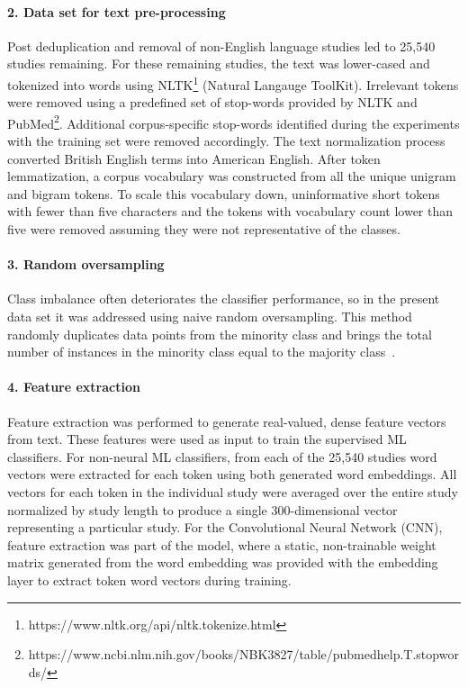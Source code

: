 \documentclass{IOS-Book-Article}
\begin{document}
\paragraph{2. Data set for text pre-processing}
\label{method:preprocessing}
%
Post deduplication and removal of non-English language studies led to 25,540 studies remaining.
For these remaining studies, the text was lower-cased and tokenized into words using NLTK\footnote{https://www.nltk.org/api/nltk.tokenize.html} (Natural Langauge ToolKit).
Irrelevant tokens were removed using a predefined set of stop-words provided by NLTK and PubMed\footnote{https://www.ncbi.nlm.nih.gov/books/NBK3827/table/pubmedhelp.T.stopwords/}.
Additional corpus-specific stop-words identified during the experiments with the training set were removed accordingly. 
The text normalization process converted British English terms into American English.
After token lemmatization, a corpus vocabulary was constructed from all the unique unigram and bigram tokens. 
To scale this vocabulary down, uninformative short tokens with fewer than five characters and the tokens with vocabulary count lower than five were removed assuming they were not representative of the classes.
%
\paragraph{3. Random oversampling}
\label{method:oversampling}
%
Class imbalance often deteriorates the classifier performance, so in the present data set it was addressed using naive random oversampling.
This method randomly duplicates data points from the minority class and brings the total number of instances in the minority class equal to the majority class~\cite{Garcia2006-wn}.
%
\paragraph{4. Feature extraction}
\label{method:feature_extraction}
%
Feature extraction was performed to generate real-valued, dense feature vectors from text.
These features were used as input to train the supervised ML classifiers.
For non-neural ML classifiers, from each of the 25,540 studies word vectors were extracted for each token using both generated word embeddings.
All vectors for each token in the individual study were averaged over the entire study normalized by study length to produce a single 300-dimensional vector representing a particular study.
For the Convolutional Neural Network (CNN), feature extraction was part of the model, where a static, non-trainable weight matrix generated from the word embedding was provided with the embedding layer to extract token word vectors during training.
%
\end{document}
